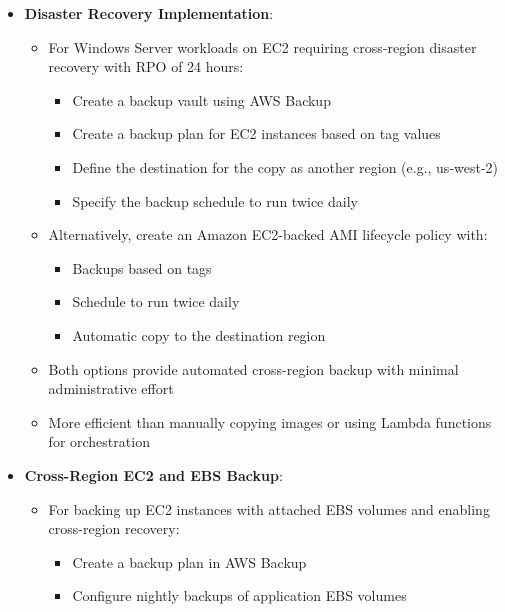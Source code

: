 \documentclass[11pt,a4paper]{report}
\begin{document}
\begin{itemize}
\begin{itemize}
  \item Can be configured to retain backups for multiple years to meet long-term compliance requirements
  \item More restrictive than standard retention policies as it prevents override by administrators
  \item Especially valuable for financial and healthcare data that must be preserved unchanged for regulatory purposes
\end{itemize}
  \item \textbf{Disaster Recovery Implementation}:
\begin{itemize}
  \item For Windows Server workloads on EC2 requiring cross-region disaster recovery with RPO of 24 hours:
\begin{itemize}
  \item Create a backup vault using AWS Backup
  \item Create a backup plan for EC2 instances based on tag values
  \item Define the destination for the copy as another region (e.g., us-west-2)
  \item Specify the backup schedule to run twice daily
\end{itemize}
  \item Alternatively, create an Amazon EC2-backed AMI lifecycle policy with:
\begin{itemize}
  \item Backups based on tags
  \item Schedule to run twice daily
  \item Automatic copy to the destination region
\end{itemize}
  \item Both options provide automated cross-region backup with minimal administrative effort
  \item More efficient than manually copying images or using Lambda functions for orchestration
\end{itemize}
  \item \textbf{Cross-Region EC2 and EBS Backup}:
\begin{itemize}
  \item For backing up EC2 instances with attached EBS volumes and enabling cross-region recovery:
\begin{itemize}
  \item Create a backup plan in AWS Backup
  \item Configure nightly backups of application EBS volumes

\end{itemize}
\end{itemize}
\end{itemize}
\end{document}
